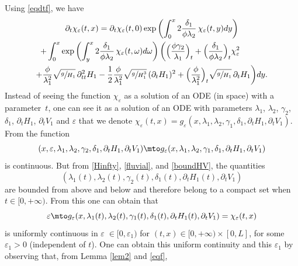 Using \eqref{eqdtf}, we have
\begin{multline}
\label{difffeps}
\partial_{t}\chi_{\varepsilon}(t,x)=\partial_{t}\chi_{\varepsilon}(t,0)\exp\left(\int_{0}^{x}2\frac{\delta_{1}}{\phi\lambda_{2}}\,\chi_{\varepsilon}(t,y) dy\right)\\
\hspace*{-1cm}+\int_{0}^{x}\exp\left(\int_{y}^{x}2\frac{\delta_{1}}{\phi\lambda_{2}}\,\chi_{\varepsilon}(t,\omega) d\omega\right)\biggl(\Bigl(\frac{\phi\gamma_{2}}{\lambda_{1}}\Bigr)_{t}+\Bigl(\frac{\delta_{1}}{\phi\lambda_{2}}\Bigr)_{t}\chi^{2}_{\varepsilon}\\
+{\frac{\phi}{{\lambda_{1}^{2}}}}\sqrt{\sfrac{g}{H_{1}}}\,\partial_{tt}^{2} H_{1}-\frac{1}{2}{\frac{\phi}{{\lambda_{1}^{2}}}}\sqrt{\sfrac{g}{H_{1}^{3}}}\,(\partial_{t}H_{1})^{2}+{\Bigl(\frac{\phi}{\lambda_{1}^{2}}\Bigr)_{t}\sqrt{\sfrac{g}{H_{1}}}\,\partial_{t} H_{1}} \biggr)dy.
\end{multline}
Instead of seeing the function $\chi_{\varepsilon}$ as a solution of an ODE {(in space)} with a parameter~$t$, one can see it as a solution of an ODE with parameters
$\lambda_{1}$, $\lambda_{2}$, $\gamma_{2}$, $\delta_{1}$, $\partial_{t}H_{1}${, $\partial_{t}V_{1}$} and $\varepsilon$ that we denote ${\chi_{\varepsilon}(t,x) =} g_{\varepsilon}(x,\lambda_{1},\lambda_{2},\gamma_{1},\delta_{1},\partial_{t}H_{1}, {\partial_{t}V_{1}})$. From \cite[Th.\,2.1]{Hartman} the function
\begin{equation*}
(x,\varepsilon, \lambda_{1}, \lambda_{2}, \gamma_{2}, \delta_{1}, \partial_{t}H_{1}, {\partial_{t}V_{1}})\mto g_{\varepsilon}(x,\lambda_{1},\lambda_{2},\gamma_{1},\delta_{1},\partial_{t}H_{1}, {\partial_{t}V_{1}})
\end{equation*}
is continuous. But from \eqref{Hinfty}, \eqref{fluvial}, and \eqref{boundHV}, the quantities
\[
(\lambda_{1}(t), \lambda_{2}(t), \gamma_{2}(t), \delta_{1}(t), \partial_{t}H_{1}(t), {\partial_{t}V_{1}})
\]
are bounded from above and below and therefore belong to a compact set when $t\in[0,+\infty)$.
From this one can obtain that
\begin{equation}
\label{uniformconteps}
\varepsilon\mto g_{\varepsilon}(x,\lambda_{1}(t),\lambda_{2}(t),\gamma_{1}(t),\delta_{1}(t),\partial_{t}H_{1}(t), {\partial_{t}V_{1}})=\chi_{\varepsilon}(t,x)
\end{equation}
is uniformly continuous in $\varepsilon \;{\in [0,\varepsilon_{1})}$ for $(t,x)\in[0,{+}\infty)\times[0,L]$, for some $\varepsilon_{1}>0$ (independent of $t$). One can obtain this uniform continuity and this $\varepsilon_{1}$ by observing that, from Lemma \ref{lem2} and \eqref{eqf},
